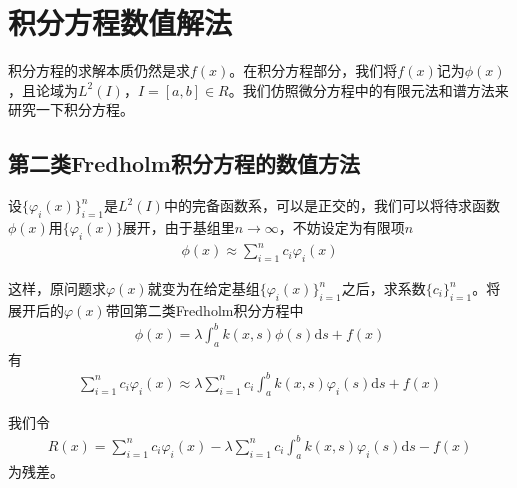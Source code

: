 \section{积分方程数值解法}
	积分方程的求解本质仍然是求$f(x)$。在积分方程部分，我们将$f(x)$记为$\phi(x)$，且论域为$L^2(I)$，$I = [a,b]\in R$。我们仿照微分方程中的有限元法和谱方法来研究一下积分方程。
	\subsection{第二类Fredholm积分方程的数值方法}
		\label{subsec:第二类Fredholm积分方程的数值方法}
		设$\{\varphi_i(x)\}_{i =1}^n$是$L^2(I)$中的完备函数系，可以是正交的，我们可以将待求函数$\phi(x)$用$\{\varphi_i(x)\}$展开，由于基组里$n\rightarrow \infty$，不妨设定为有限项$n$
		\begin{align*}
			\phi(x) \approx \sum_{i =1}^n c_i \varphi_i(x)
		\end{align*}
		\par
		这样，原问题求$\varphi(x)$就变为在给定基组$\{\varphi_i(x)\}_{i =1}^n$之后，求系数$\{c_i\}_{i =1}^n$。将展开后的$\varphi(x)$带回第二类Fredholm积分方程中
		\begin{align}
			\label{第二类Fredholm积分方程}
			\phi(x) = \lambda \int_{a}^{b} k(x,s) \phi(s)\mathrm{d}s + f(x)
		\end{align}
		有
		\begin{align*}
			\sum_{i =1}^n c_i \varphi_i(x) \approx \lambda \sum_{i =1}^n c_i \int_{a}^{b} k(x,s) \varphi_i(s)\mathrm{d}s + f(x)
		\end{align*}
		\par
		我们令
		\begin{align*}
			R(x) = \sum_{i =1}^n c_i \varphi_i(x) - \lambda \sum_{i =1}^n c_i \int_{a}^{b} k(x,s) \varphi_i(s)\mathrm{d}s - f(x)
		\end{align*}
		为残差。

